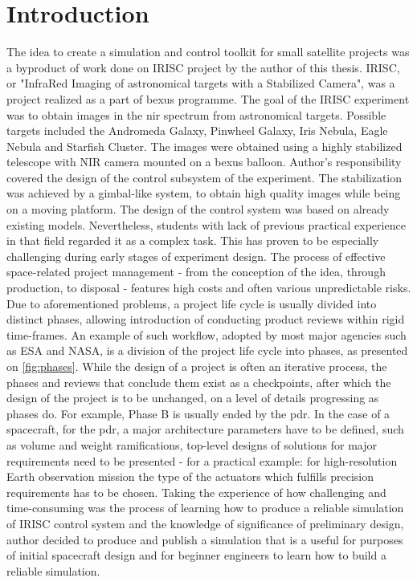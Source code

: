 \section{Introduction}\label{sec:introduction}
    \vfill
    The idea to create a simulation and control toolkit for small satellite projects was a byproduct of work done on IRISC project by the author of this thesis. IRISC, or "InfraRed Imaging of astronomical targets with a Stabilized Camera", was a project realized as a part of \ac{bexus} programme. The goal of the IRISC experiment was to obtain images in the \ac{nir} spectrum from astronomical targets. Possible targets included the Andromeda Galaxy, Pinwheel Galaxy, Iris Nebula, Eagle Nebula and Starfish Cluster. The images were obtained using a highly stabilized telescope with NIR camera mounted on a \ac{bexus} balloon. Author's responsibility covered the design of the control subsystem of the experiment. The stabilization was achieved by a gimbal-like system, to obtain high quality images while being on a moving platform\cite{irisc-sed}. The design of the control system was based on already existing models. Nevertheless, students with lack of previous practical experience in that field regarded it as a complex task. This has proven to be especially challenging during early stages of experiment design.
    \vfill
    The process of effective space-related project management - from the conception of the idea, through production, to disposal - features high costs and often various unpredictable risks. Due to aforementioned problems, a project life cycle is usually divided into distinct phases, allowing introduction of conducting product reviews within rigid time-frames. An example of such workflow, adopted by most major agencies such as ESA\cite{managementecss} and NASA\cite{kapurch2010nasa}, is a division of the project life cycle into phases, as presented on \autoref{fig:phases}. While the design of a project is often an iterative process, the phases and reviews that conclude them exist as a checkpoints, after which the design of the project is to be unchanged, on a level of details progressing as phases do. For example, Phase B is usually ended by the \ac{pdr}. In the case of a spacecraft, for the \ac{pdr}, a major architecture parameters have to be defined, such as volume and weight ramifications, top-level designs of solutions for major requirements need to be presented - for a practical example: for high-resolution Earth observation mission the type of the actuators which fulfills precision requirements has to be chosen.
    \vfill
    Taking the experience of how challenging and time-consuming was the process of learning how to produce a reliable simulation of IRISC control system and the knowledge of significance of preliminary design, author decided to produce and publish a simulation that is a useful for purposes of initial spacecraft design and for beginner engineers to learn how to build a reliable simulation. 

